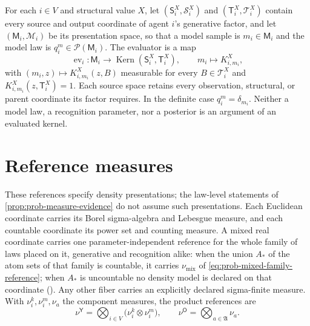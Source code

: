 For each $i\in V$ and structural value $X$, let $(\mathsf S_i^X,\mathscr S_i^X)$ and
$(\mathsf T_i^X,\mathscr T_i^X)$ contain every source and output coordinate of agent $i$'s generative
factor, and let $(\mathsf M_i,\mathscr M_i)$ be its presentation space, so that a model sample is
$m_i\in\mathsf M_i$ and the model law is $q_i^m\in\mathcal P(\mathsf M_i)$. The evaluator is a map
\begin{equation}
\operatorname{ev}_i:\mathsf M_i\longrightarrow\operatorname{Kern}(\mathsf S_i^X,\mathsf T_i^X),
\qquad
m_i\longmapsto K^X_{i,m_i},
\label{eq:prob-model-evaluation}
\end{equation}
with $(m_i,z)\mapsto K^X_{i,m_i}(z,B)$ measurable for every $B\in\mathscr T_i^X$ and
$K^X_{i,m_i}(z,\mathsf T_i^X)=1$. Each source space retains every observation, structural, or parent
coordinate its factor requires. In the definite case $q_i^m=\delta_{m_i}$. Neither a model law, a
recognition parameter, nor a posterior is an argument of an evaluated kernel.

\section{Reference measures}
\label{sec:prob-reference}

These references specify density presentations; the law-level statements
of \cref{prop:prob-measure-evidence} do not assume such presentations.
Each Euclidean coordinate carries its Borel sigma-algebra and Lebesgue measure, and each countable
coordinate its power set and counting measure. A mixed real coordinate carries one parameter-independent
reference for the whole family of laws placed on it, generative and recognition alike: when the union
$A_*$ of the atom sets of that family is countable, it carries $\nu_{\mathrm{mix}}$ of
\eqref{eq:prob-mixed-family-reference}; when $A_*$ is uncountable no density model is declared on that
coordinate (). Any other fiber carries an explicitly
declared sigma-finite measure. With $\nu_i^k,\nu_i^m,\nu_a$ the component measures, the product
references are
\begin{equation}
\nu^{\mathsf Y}=\bigotimes_{i\in V}\bigl(\nu_i^k\otimes\nu_i^m\bigr),
\qquad
\nu^{\mathsf O}=\bigotimes_{a\in\mathfrak A}\nu_a.
\label{eq:prob-reference-measures}
\end{equation}

